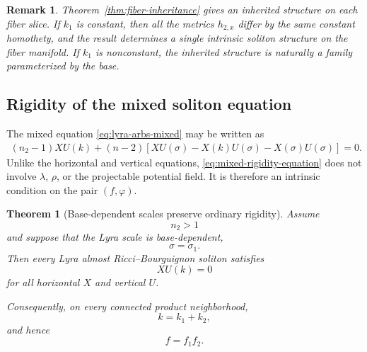 \documentclass[a4paper,11pt]{article}
\theoremstyle{plain}
\newtheorem{theorem}{Theorem}[section]
\newtheorem{remark}{Remark}[section]
\numberwithin{equation}{section}
\begin{document}
\begin{remark}
	\label{rem:genuine-fiber-inheritance}
	Theorem~\ref{thm:fiber-inheritance} gives an inherited structure
	on each fiber slice. If \(k_{1}\) is constant, then all the
	metrics \(h_{2,x}\) differ by the same constant homothety, and
	the result determines a single intrinsic soliton structure on
	the fiber manifold. If \(k_{1}\) is nonconstant, the inherited
	structure is naturally a family parameterized by the base.
\end{remark}

\subsection{Rigidity of the mixed soliton equation}
\label{subsec:mixed-rigidity}

The mixed equation
\eqref{eq:lyra-arbs-mixed} may be written as
\begin{align}
	(n_{2}-1)XU(k)
	+
	(n-2)
	\left[
	XU(\sigma)
	-
	X(k)U(\sigma)
	-
	X(\sigma)U(\sigma)
	\right]
	=
	0.
	\label{eq:mixed-rigidity-equation}
\end{align}
Unlike the horizontal and vertical equations,
\eqref{eq:mixed-rigidity-equation} does not involve
\(\lambda\), \(\rho\), or the projectable potential field. It is
therefore an intrinsic condition on the pair \((f,\varphi)\).

\begin{theorem}[Base-dependent scales preserve ordinary rigidity]
	\label{thm:base-scale-rigidity}
	Assume
	\[
	n_{2}>1
	\]
	and suppose that the Lyra scale is base-dependent,
	\begin{equation}
		\sigma=\sigma_{1}.
		\label{eq:base-dependent-scale}
	\end{equation}
	Then every Lyra almost Ricci--Bourguignon soliton satisfies
	\begin{equation}
		XU(k)=0
		\label{eq:ordinary-mixed-separation}
	\end{equation}
	for all horizontal \(X\) and vertical \(U\).
	
	Consequently, on every connected product neighborhood,
	\begin{equation}
		k=k_{1}+k_{2},
		\label{eq:additive-separation-k}
	\end{equation}
	and hence
	\begin{equation}
		f=f_{1}f_{2}.
		\label{eq:multiplicative-separation-f}
	\end{equation}
\end{theorem}
\end{document}
